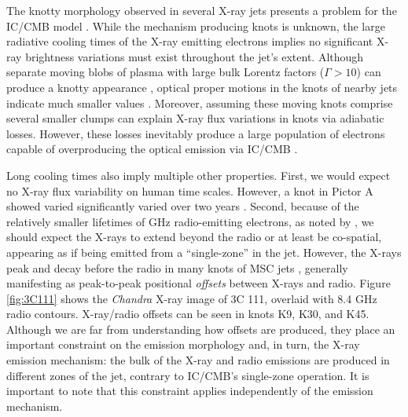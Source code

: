 The knotty morphology observed in several X-ray jets presents a problem for the IC/CMB model \citep[e.g.,][]{sambruna2004survey,jester2006new,Clautice:2016zai,siemiginowska2007300}. While the mechanism producing knots is unknown, the large radiative cooling times of the X-ray emitting electrons  \citep[$\geq 10^6$ years, e.g.,][]{harris2006x} implies no significant X-ray brightness variations must exist throughout the jet's extent. Although separate moving blobs of plasma with large bulk Lorentz factors ($\Gamma>10$) can produce a knotty appearance \citep{tavecchio2003clumps}, optical proper motions in the knots of nearby jets indicate much smaller values \citep[$\Gamma<2.9$ in 3C 273, e.g., ][]{meyer2016hst}. Moreover, assuming these moving knots comprise several smaller clumps can explain X-ray flux variations in knots via adiabatic losses. However, these losses inevitably produce a large population of electrons capable of overproducing the optical emission via IC/CMB \citep{stawarz2004multiwavelength}.

Long cooling times also imply multiple other properties. First, we would expect no X-ray flux variability on human time scales. However, a knot in Pictor A showed varied significantly varied over two years \citep{marshall2010flare}. Second, because of the relatively smaller lifetimes of GHz radio-emitting electrons, as noted by \citet{worrall2009x}, we should expect the X-rays to extend beyond the radio or at least be co-spatial, appearing as if being emitted from a ``single-zone'' in the jet. However, the X-rays peak and decay before the radio in many knots of MSC jets \citep[e.g.,][]{2005MNRAS.360..926W,siemiginowska2007300,kataoka2008chandra,worrall2009x,Clautice:2016zai}, generally manifesting as peak-to-peak positional \textit{offsets} between X-rays and radio. Figure \ref{fig:3C111} shows the \textit{Chandra} X-ray image of 3C 111, overlaid with 8.4 GHz radio contours. X-ray/radio offsets can be seen in knots K9, K30, and K45. Although we are far from understanding how offsets are produced, they place an important constraint on the emission morphology and, in turn, the X-ray emission mechanism: the bulk of the X-ray and radio emissions are produced in different zones of the jet, contrary to IC/CMB's single-zone operation. It is important to note that this constraint applies independently of the emission mechanism.

